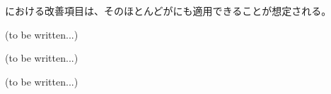 

\MMC における改善項目は、そのほとんどが\DMC にも適用できることが想定される。


(to be written...)



(to be written...)



(to be written...)
